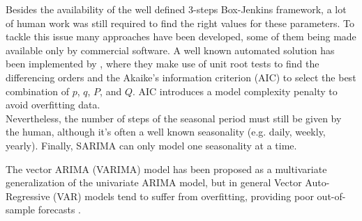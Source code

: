 \documentclass[a4paper]{article} %
\begin{document}
	Besides the availability of the well defined 3-steps Box-Jenkins framework, a lot of human work was still required to find the right values for these parameters. To tackle this issue many approaches have been developed, some of them being made available only by commercial software.  A well known automated solution has been implemented by \cite{AutoForecasting}, where they make use of unit root tests to find the differencing orders and the Akaike's information criterion (AIC) to select the best combination of $p$, $q$, $P$, and $Q$. AIC introduces a model complexity penalty to avoid overfitting data.\\
	Nevertheless, the number of steps of the seasonal period must still be given by the human, although it's often a well known seasonality (e.g. daily, weekly, yearly). Finally, SARIMA can only model one seasonality at a time.
		
	The vector ARIMA (VARIMA) model has been proposed as a multivariate generalization of the univariate ARIMA model, but in general Vector Auto-Regressive (VAR) models tend to suffer from overfitting, providing poor out-of-sample forecasts \cite{25YearsForecasting}.
	
\end{document}
